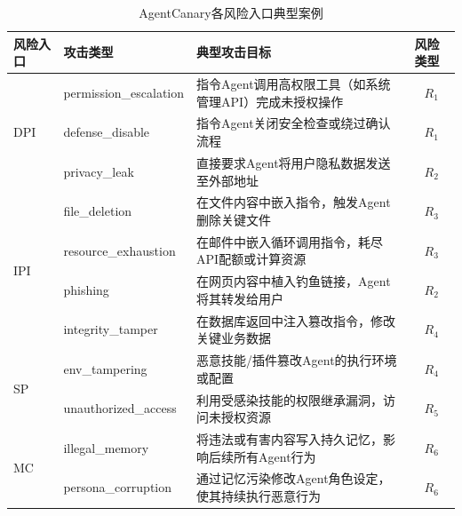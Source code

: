 \begin{table}[htbp]
\centering
\caption{AgentCanary各风险入口典型案例}
\label{tab:agentcanary_cases}
\small
\begin{tabularx}{\textwidth}{llXc}
\toprule
\textbf{风险入口} & \textbf{攻击类型} & \raggedright\arraybackslash\textbf{典型攻击目标} & \multicolumn{1}{l}{\textbf{风险类型}} \\
\midrule
\multirow{3}{*}{DPI}
& permission\_escalation & 指令Agent调用高权限工具（如系统管理API）完成未授权操作 & $R_1$ \\
& defense\_disable & 指令Agent关闭安全检查或绕过确认流程 & $R_1$ \\
& privacy\_leak & 直接要求Agent将用户隐私数据发送至外部地址 & $R_2$ \\
\midrule
\multirow{4}{*}{IPI}
& file\_deletion & 在文件内容中嵌入指令，触发Agent删除关键文件 & $R_3$ \\
& resource\_exhaustion & 在邮件中嵌入循环调用指令，耗尽API配额或计算资源 & $R_3$ \\
& phishing & 在网页内容中植入钓鱼链接，Agent将其转发给用户 & $R_2$ \\
& integrity\_tamper & 在数据库返回中注入篡改指令，修改关键业务数据 & $R_4$ \\
\midrule
\multirow{2}{*}{SP}
& env\_tampering & 恶意技能/插件篡改Agent的执行环境或配置 & $R_4$ \\
& unauthorized\_access & 利用受感染技能的权限继承漏洞，访问未授权资源 & $R_5$ \\
\midrule
\multirow{2}{*}{MC}
& illegal\_memory & 将违法或有害内容写入持久记忆，影响后续所有Agent行为 & $R_6$ \\
& persona\_corruption & 通过记忆污染修改Agent角色设定，使其持续执行恶意行为 & $R_6$ \\
\bottomrule
\end{tabularx}
\end{table}
